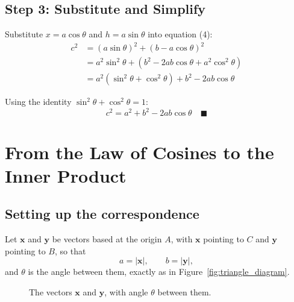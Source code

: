\documentclass[12pt]{article}
\newcommand{\MVec}[1]{\mathbf{#1}}
\begin{document}
\subsection*{Step 3: Substitute and Simplify}
Substitute $x = a \cos\theta$ and $h = a \sin\theta$ into equation (4):
\begin{align*}
    c^2 &= (a \sin\theta)^2 + (b - a \cos\theta)^2 \\
        &= a^2 \sin^2\theta + \left(b^2 - 2ab \cos\theta + a^2 \cos^2\theta\right) \\
        &= a^2 \left(\sin^2\theta + \cos^2\theta\right) + b^2 - 2ab \cos\theta
\end{align*}

\noindent Using the identity $\sin^2\theta + \cos^2\theta = 1$:
\begin{equation}
    c^2 = a^2 + b^2 - 2ab \cos\theta \quad \blacksquare
\end{equation}

\newpage
\section{From the Law of Cosines to the Inner Product}

\subsection*{Setting up the correspondence}
Let $\MVec{x}$ and $\MVec{y}$ be vectors based at the origin $A$, with
$\MVec{x}$ pointing to $C$ and $\MVec{y}$ pointing to $B$, so that
\[
    a = |\MVec{x}|, \qquad b = |\MVec{y}|,
\]
and $\theta$ is the angle between them, exactly as in
Figure~\ref{fig:triangle_diagram}.

\begin{figure}[h]
\centering
{}
\caption{The vectors $\MVec{x}$ and $\MVec{y}$, with angle $\theta$ between them.}
\label{fig:vector_triangle}
\end{figure}
\end{document}
